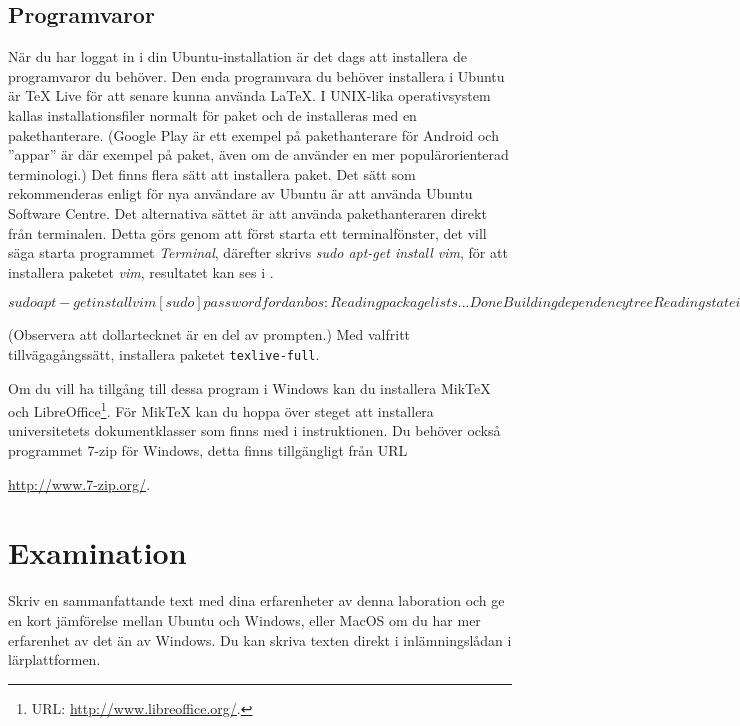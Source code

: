 \documentclass[a4paper,nocourse]{miunasgn}
\begin{document}
\subsection{Programvaror}
\noindent
När du har loggat in i din Ubuntu-installation är det dags att installera de 
programvaror du behöver.
Den enda programvara du behöver installera i Ubuntu är TeX Live för att senare 
kunna använda \LaTeX.
I UNIX-lika operativsystem kallas installationsfiler normalt för paket och de 
installeras med en pakethanterare.
(Google Play är ett exempel på pakethanterare för Android och ''appar'' är där 
exempel på paket, även om de använder en mer populärorienterad terminologi.)
Det finns flera sätt att installera paket.
Det sätt som rekommenderas enligt \citet{UbuntuDesktop} för nya användare av 
Ubuntu är att använda Ubuntu Software Centre.
Det alternativa sättet är att använda pakethanteraren direkt från terminalen.
Detta görs genom att först starta ett terminalfönster, det vill säga starta 
programmet \emph{Terminal}, därefter skrivs \emph{sudo apt-get install vim}, 
för att installera paketet \emph{vim}, resultatet kan ses 
i .
\begin{terminal}[float,label={fig:installvim},caption={Exempel från terminalen 
  vid installation av \term{vim(1)}.}]
$ sudo apt-get install vim
[sudo] password for danbos: 
Reading package lists... Done
Building dependency tree       
Reading state information... Done
vim is already the newest version.
The following package was automatically installed and is no longer required:
  john-data
Use 'apt-get autoremove' to remove them.
0 upgraded, 0 newly installed, 0 to remove and 59 not upgraded.
$
\end{terminal}
(Observera att dollartecknet är en del av prompten.)
Med valfritt tillvägagångssätt, installera paketet \texttt{texlive-full}.

Om du vill ha tillgång till dessa program i Windows kan du installera MikTeX 
\citep{Bosk2012lui} och LibreOffice\footnote{%
	URL: \url{http://www.libreoffice.org/}.
}.
För MikTeX kan du hoppa över steget att installera universitetets 
dokumentklasser som finns med i instruktionen.
Du behöver också programmet 7-zip för Windows, detta finns tillgängligt från 
URL
\begin{center}
	\url{http://www.7-zip.org/}.
\end{center}


\section{Examination}
\label{sec:Examination}
Skriv en sammanfattande text med dina erfarenheter av denna laboration och ge 
en kort jämförelse mellan Ubuntu och Windows, eller MacOS om du har mer 
erfarenhet av det än av Windows.
Du kan skriva texten direkt i inlämningslådan i lärplattformen.


\printbibliography
\end{document}
